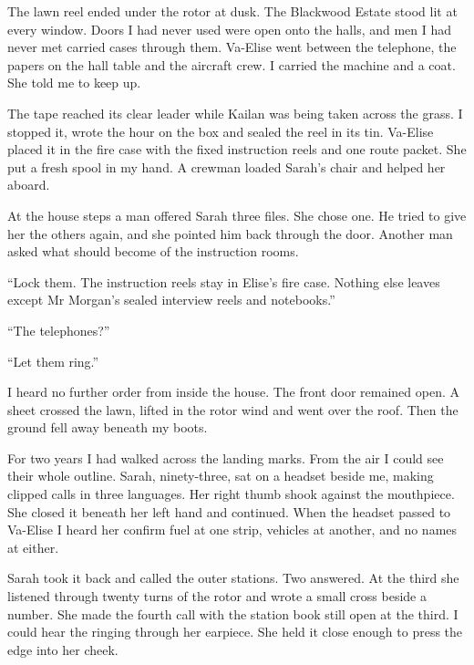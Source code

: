 The lawn reel ended under the rotor at dusk. The Blackwood Estate stood lit at every window. Doors I had never used were open onto the halls, and men I had never met carried cases through them. Va-Elise went between the telephone, the papers on the hall table and the aircraft crew. I carried the machine and a coat. She told me to keep up.\par

The tape reached its clear leader while Kailan was being taken across the grass. I stopped it, wrote the hour on the box and sealed the reel in its tin. Va-Elise placed it in the fire case with the fixed instruction reels and one route packet. She put a fresh spool in my hand. A crewman loaded Sarah's chair and helped her aboard.\par

At the house steps a man offered Sarah three files. She chose one. He tried to give her the others again, and she pointed him back through the door. Another man asked what should become of the instruction rooms.\par

``Lock them. The instruction reels stay in Elise's fire case. Nothing else leaves except Mr Morgan's sealed interview reels and notebooks.''\par

``The telephones?''\par

``Let them ring.''\par

I heard no further order from inside the house. The front door remained open. A sheet crossed the lawn, lifted in the rotor wind and went over the roof. Then the ground fell away beneath my boots.\par

For two years I had walked across the landing marks. From the air I could see their whole outline. Sarah, ninety-three, sat on a headset beside me, making clipped calls in three languages. Her right thumb shook against the mouthpiece. She closed it beneath her left hand and continued. When the headset passed to Va-Elise I heard her confirm fuel at one strip, vehicles at another, and no names at either.\par

Sarah took it back and called the outer stations. Two answered. At the third she listened through twenty turns of the rotor and wrote a small cross beside a number. She made the fourth call with the station book still open at the third. I could hear the ringing through her earpiece. She held it close enough to press the edge into her cheek.\par

